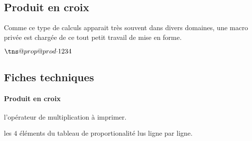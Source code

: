 \documentclass[12pt,a4paper]{article}
\begin{document}

\subsection{Produit en croix}

Comme ce type de calculs apparait très souvent dans divers domaines, une macro privée est chargée de ce tout petit travail de mise en forme.

\begin{latexex}
\makeatletter
$\tns@prop@prod{\cdot} %
               {1}{2}  %
               {3}{4}$ %
\makeatother
\end{latexex}




\subsection{Fiches techniques}

\paragraph{Produit en croix}



 l'opérateur de multiplication à imprimer.

 les $4$ éléments du tableau de proportionalité lus ligne par ligne.
\end{document}
